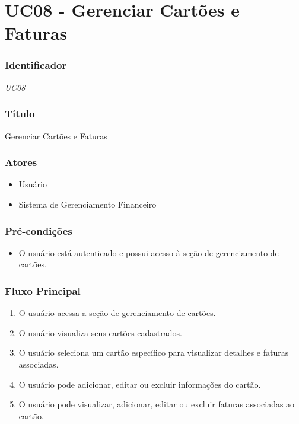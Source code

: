 \chapter{UC08 - Gerenciar Cartões e Faturas}
\label{apendiceUC08}

\subsection*{Identificador}
\textit{UC08}

\subsection*{Título}
Gerenciar Cartões e Faturas

\subsection*{Atores}
\begin{addmargin}[1.5cm]{0cm}
    \begin{itemize}
        \item Usuário
        \item Sistema de Gerenciamento Financeiro
    \end{itemize}
\end{addmargin}

\subsection*{Pré-condições}
\begin{addmargin}[1.5cm]{0cm}
    \begin{itemize}
        \item O usuário está autenticado e possui acesso à seção de gerenciamento de cartões.
    \end{itemize}
\end{addmargin}

\subsection*{Fluxo Principal}
\begin{addmargin}[1.5cm]{0cm}
    \begin{enumerate}
        \item O usuário acessa a seção de gerenciamento de cartões.
        \item O usuário visualiza seus cartões cadastrados.
        \item O usuário seleciona um cartão específico para visualizar detalhes e faturas associadas.
        \item O usuário pode adicionar, editar ou excluir informações do cartão.
        \item O usuário pode visualizar, adicionar, editar ou excluir faturas associadas ao cartão.
    \end{enumerate}
\end{addmargin}

